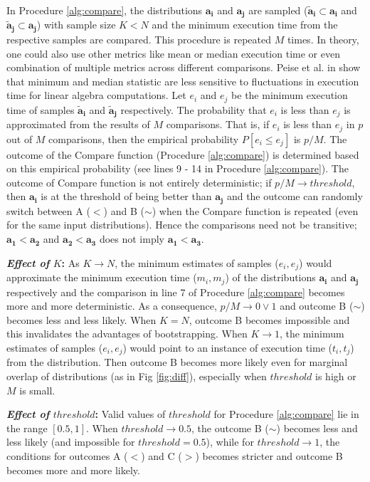 \documentclass[conference]{IEEEtran}
\begin{document}
In Procedure \ref{alg:compare}, the distributions $\mathbf{a_i}$ and $\mathbf{a_j}$ are sampled ($\mathbf{\tilde{a}_i} \subset \mathbf{a_i}$ and $\mathbf{\tilde{a}_j} \subset \mathbf{a_j}$) with sample size $K < N $ and the minimum
execution time from the respective samples are compared. This procedure is repeated $M$ times. In theory, one could
also use other metrics like mean or median execution time or even combination of multiple metrics across different
comparisons. Peise et al. in \cite{peisethesis} show that minimum and median statistic are less sensitive to fluctuations in execution time for linear algebra computations.  Let $e_i$ and $e_j$ be the minimum execution time of samples  $\mathbf{\tilde{a}_i}$ and $\mathbf{\tilde{a}_j}$ respectively. The probability that $e_i$ is less than $e_j$ is approximated from the results of $M$ comparisons. That is, if $e_i$ is less than $e_j$ in $p$ out of $M$ comparisons, then the empirical probability $P[e_i \le e_j]$ is $p/M$. The outcome of the Compare function (Procedure \ref{alg:compare}) is determined based on this empirical probability (see lines 9 - 14 in Procedure \ref{alg:compare}). The outcome of Compare function is not entirely deterministic; if $p/M \to threshold$, then  $\mathbf{a_i}$ is at the threshold of being better than $\mathbf{a_j}$ and the outcome can randomly switch between A ($<$) and B ($\sim$) when the Compare function is repeated (even for the same input distributions). Hence the comparisons need not be transitive;  $\mathbf{a_1} < \mathbf{a_2}$ and
$\mathbf{a_2} < \mathbf{a_3} $ does not imply $\mathbf{a_1} < \mathbf{a_3}$.

\textbf{\textit{Effect of} $K$:} As $K \to N$, the minimum estimates of samples ($e_i, e_j$) would approximate the minimum execution time ($m_i, m_j$) of the distributions $\mathbf{a_i}$ and $\mathbf{a_j}$ respectively and the comparison in line 7 of Procedure \ref{alg:compare} becomes more and more deterministic. As a consequence, $p/M \to 0 \lor 1$ and outcome B ($\sim$) becomes less and less likely. When $K=N$, outcome B becomes impossible and this invalidates the advantages of bootstrapping. When $K \to 1$, the minimum estimates of samples ($e_i, e_j$) would point to an instance of execution time ($t_i, t_j$) from the distribution. Then outcome B becomes more likely even for marginal overlap of distributions (as in Fig \ref{fig:diff}), especially when $threshold$ is high or $M$ is small.


\textbf{\textit{Effect of }$threshold$:} Valid values of $threshold$ for Procedure \ref{alg:compare} lie in the range $[0.5,1]$. When $threshold \to 0.5$, the outcome B ($\sim$) becomes
less and less likely (and impossible for $threshold=0.5$), while for $threshold \to 1$, the conditions for outcomes A ($<$)
and C ($>$) becomes stricter and outcome B becomes more and more likely. 
\end{document}
